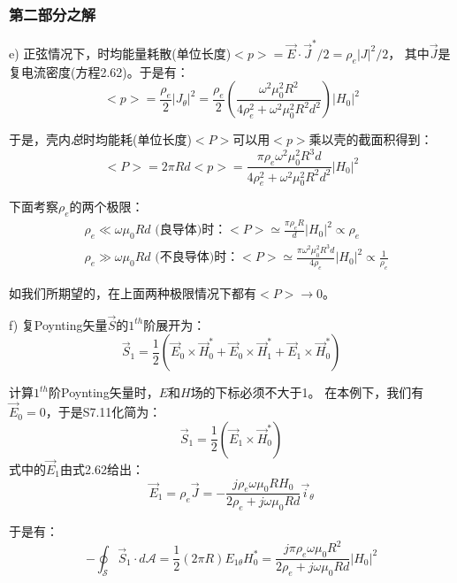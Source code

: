 \subsubsection*{第二部分之解}
e) 正弦情况下，时均能量耗散(单位长度)$<p>=\vec{E}\cdot \vec{J}^* /2=\rho_e |J|^2 /2$，
其中$\vec{J}$是复电流密度(方程2.62)。于是有：
\begin{equation*}
<p>=\frac{\rho_e}{2}|J_\theta|^2=\frac{\rho_e}{2}\left(\frac{\omega^2 \mu_0^2 R^2}{4\rho_e^2+\omega^2 \mu_0^2 R^2 d^2}\right)|H_0|^2 \tag{S7.9}
\end{equation*}

于是，壳内\textit{总}时均能耗(单位长度)$<P>$可以用$<p>$乘以壳的截面积得到：
\begin{equation*}
<P>=2\pi R d<p>=\frac{\pi \rho_e \omega^2 \mu_0^2 R^3 d}{4\rho_e^2+\omega^2 \mu_0^2 R^2 d^2}|H_0|^2 \tag{2.63}
\end{equation*}

下面考察$\rho_e$的两个极限：
\begin{align}
&\rho_e \ll \omega \mu_0 R d\mbox{ (良导体)时：}<P>\simeq \frac{\pi \rho_e R}{d}|H_0|^2\propto \rho_e\nonumber\tag{S7.10a}\\
&\rho_e \gg \omega \mu_0 R d\mbox{ (不良导体)时：}<P>\simeq \frac{\pi \omega^2 \mu_0^2 R^3 d}{4\rho_e}|H_0|^2\propto \frac{1}{\rho_e}\nonumber\tag{S7.10b}
\end{align}

如我们所期望的，在上面两种极限情况下都有$<P>\rightarrow 0$。

f) 复Poynting矢量$\vec{S}$的$1^{th}$阶展开为：
\begin{equation*}
\vec{S}_1=\frac{1}{2}(\vec{E}_0 \times \vec{H}_0^*+\vec{E}_0 \times \vec{H}_1^*+\vec{E}_1 \times \vec{H}_0^*) \tag{S7.11}
\end{equation*}

计算$1^{th}$阶Poynting矢量时，$E$和$H$场的下标必须不大于1。
在本例下，我们有$\vec{E}_0=0$，于是S7.11化简为：
\begin{equation*}
\vec{S}_1=\frac{1}{2}(\vec{E}_1 \times \vec{H}_0^*) \tag{S7.12}
\end{equation*}
式中的$\vec{E}_1$由式2.62给出：
\begin{equation*}
\vec{E}_1=\rho_e \vec{J}=-\frac{j\rho_e \omega \mu_0 R H_0}{2\rho_e+j\omega \mu_0 R d}\vec{i}_\theta \tag{S7.13}
\end{equation*}

于是有：
\begin{equation*}
-\oint_{\mathcal{S}}\vec{S}_1 \cdot d\mathcal{A}=\frac{1}{2}(2\pi R)E_{1\theta} H_0^*=\frac{j\pi\rho_e \omega \mu_0 R^2}{2\rho_e+j\omega \mu_0 R d} |H_0|^2 \tag{2.64}
\end{equation*}

